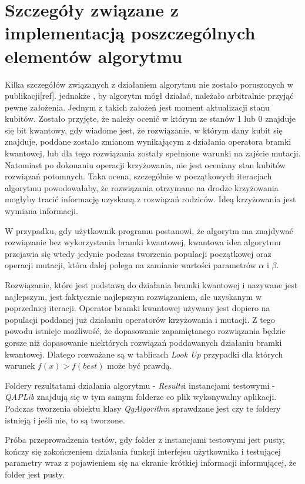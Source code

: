 \section{Szczegóły związane z implementacją poszczególnych elementów algorytmu}
Kilka szczegółów związanych z działaniem algorytmu nie zostało poruszonych w publikacji[ref]. jednakże , by algorytm mógł działać, należało arbitralnie przyjąć pewne założenia. Jednym z takich założeń jest moment aktualizacji stanu kubitów. Zostało przyjęte, że należy ocenić w którym ze stanów 1 lub 0 znajduje się bit kwantowy, gdy wiadome jest, że rozwiązanie, w którym dany kubit się znajduje, poddane zostało zmianom wynikającym z działania operatora bramki kwantowej, lub dla tego rozwiązania zostały spełnione warunki na zajście mutacji. Natomiast po dokonaniu operacji krzyżowania, nie jest oceniany stan kubitów rozwiązań potomnych. Taka ocena, szczególnie w początkowych iteracjach algorytmu powodowałaby, że rozwiązania otrzymane na drodze krzyżowania mogłyby tracić informację uzyskaną z rozwiązań rodziców. Ideą krzyżowania jest wymiana informacji.

W przypadku, gdy użytkownik programu postanowi, że algorytm ma znajdywać rozwiązanie bez wykorzystania bramki kwantowej, kwantowa idea algorytmu przejawia się wtedy jedynie podczas tworzenia populacji początkowej oraz operacji mutacji, która dalej polega na zamianie wartości parametrów $\alpha$ i $\beta$.

Rozwiązanie, które jest podstawą do działania bramki kwantowej i nazywane jest najlepszym, jest faktycznie najlepszym rozwiązaniem, ale uzyskanym w poprzedniej iteracji. Operator bramki kwantowej używany jest dopiero na populacji poddanej już działaniu operatorów krzyżowania i mutacji. Z tego powodu istnieje możliwość, że dopasowanie zapamiętanego rozwiązania będzie gorsze niż dopasowanie niektórych rozwiązań poddawanych działaniu bramki kwantowej. Dlatego rozważane są w tablicach \textit{Look Up} przypadki dla których warunek $f(x)>f(best)$ może być prawdą.

Foldery rezultatami działania algorytmu - \textit{Results}i instancjami testowymi - \textit{QAPLib} znajdują się w tym samym folderze co plik wykonywalny aplikacji. Podczas tworzenia obiektu klasy \textit{QgAlgorithm} sprawdzane jest czy te foldery istnieją i jeśli nie, to są tworzone.

Próba przeprowadzenia testów, gdy folder z instancjami testowymi jest pusty, kończy się zakończeniem działania funkcji interfejsu użytkownika i testującej parametry wraz z pojawieniem się na ekranie krótkiej informacji informującej, że folder jest pusty.